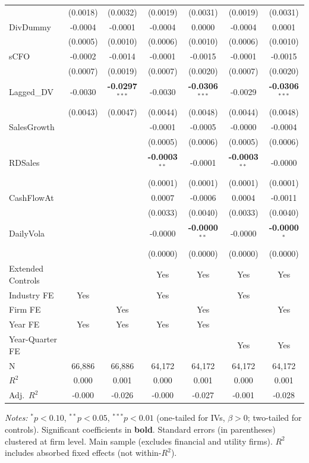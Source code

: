 \documentclass[11pt,a4paper]{article}
\begin{document}
\begin{table}[htbp]
\begin{tabular}{lcccccc}
 & (0.0018) & (0.0032) & (0.0019) & (0.0031) & (0.0019) & (0.0031) \\
DivDummy & -0.0004 & -0.0001 & -0.0004 & 0.0000 & -0.0004 & 0.0001 \\
 & (0.0005) & (0.0010) & (0.0006) & (0.0010) & (0.0006) & (0.0010) \\
sCFO & -0.0002 & -0.0014 & -0.0001 & -0.0015 & -0.0001 & -0.0015 \\
 & (0.0007) & (0.0019) & (0.0007) & (0.0020) & (0.0007) & (0.0020) \\
Lagged\_DV & -0.0030 & \textbf{-0.0297}$^{***}$ & -0.0030 & \textbf{-0.0306}$^{***}$ & -0.0029 & \textbf{-0.0306}$^{***}$ \\
 & (0.0043) & (0.0047) & (0.0044) & (0.0048) & (0.0044) & (0.0048) \\
SalesGrowth &  &  & -0.0001 & -0.0005 & -0.0000 & -0.0004 \\
 &  &  & (0.0005) & (0.0006) & (0.0005) & (0.0006) \\
RDSales &  &  & \textbf{-0.0003}$^{**}$ & -0.0001 & \textbf{-0.0003}$^{**}$ & -0.0000 \\
 &  &  & (0.0001) & (0.0001) & (0.0001) & (0.0001) \\
CashFlowAt &  &  & 0.0007 & -0.0006 & 0.0004 & -0.0011 \\
 &  &  & (0.0033) & (0.0040) & (0.0033) & (0.0040) \\
DailyVola &  &  & -0.0000 & \textbf{-0.0000}$^{**}$ & -0.0000 & \textbf{-0.0000}$^{*}$ \\
 &  &  & (0.0000) & (0.0000) & (0.0000) & (0.0000) \\
\midrule
Extended Controls &  &  & Yes & Yes & Yes & Yes \\
Industry FE & Yes &  & Yes &  & Yes &  \\
Firm FE &  & Yes &  & Yes &  & Yes \\
Year FE & Yes & Yes & Yes & Yes &  &  \\
Year-Quarter FE &  &  &  &  & Yes & Yes \\
\midrule
N & 66,886 & 66,886 & 64,172 & 64,172 & 64,172 & 64,172 \\
$R^2$ & 0.000 & 0.001 & 0.000 & 0.001 & 0.000 & 0.001 \\
Adj.~$R^2$ & -0.000 & -0.026 & -0.000 & -0.027 & -0.001 & -0.028 \\
\bottomrule
\end{tabular}
\begin{minipage}{\linewidth}
\vspace{2pt}\scriptsize
\textit{Notes:} $^{*}p<0.10$, $^{**}p<0.05$, $^{***}p<0.01$ (one-tailed for IVs, $\beta > 0$; two-tailed for controls).
 Significant coefficients in \textbf{bold}.
 Standard errors (in parentheses) clustered at firm level.
 Main sample (excludes financial and utility firms).
 $R^2$ includes absorbed fixed effects (not within-$R^2$).
\end{minipage}
\end{table}
\end{document}
